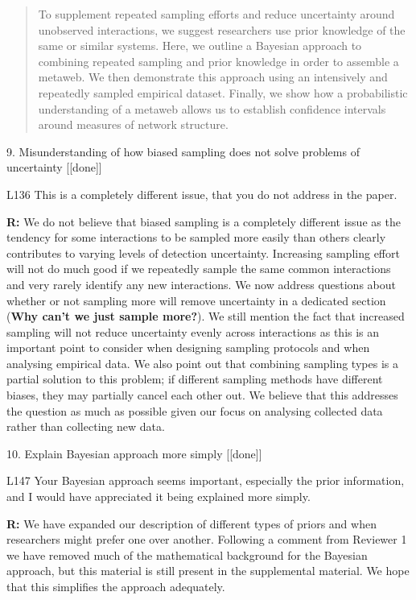 \documentclass[12pt]{letter}
\newenvironment{refquote}{\bigskip \begin{it}}{\end{it}\smallskip}
\begin{document}
		\begin{quotation}
			To supplement repeated sampling efforts and reduce uncertainty around unobserved interactions, we suggest researchers use prior knowledge of the same or similar systems. Here, we outline a Bayesian approach to combining repeated sampling and prior knowledge in order to assemble a metaweb. We then demonstrate this approach using an intensively and repeatedly sampled empirical dataset. Finally, we show how a probabilistic understanding of a metaweb allows us to establish confidence intervals around measures of network structure.
			\end{quotation}


	9. Misunderstanding of how biased sampling does not solve problems of uncertainty [[done]]

		\begin{refquote}
		L136 This is a completely different issue, that you do not address in the paper.
		\end{refquote}

		\textbf{R:} We do not believe that biased sampling is a completely different issue as the tendency for some interactions to be sampled more easily than others clearly contributes to varying levels of detection uncertainty. Increasing sampling effort will not do much good if we repeatedly sample the same common interactions and very rarely identify any new interactions. We now address questions about whether or not sampling more will remove uncertainty in a dedicated section (\textbf{Why can't we just sample more?}). We still mention the fact that increased sampling will not reduce uncertainty evenly across interactions as this is an important point to consider when designing sampling protocols and when analysing empirical data. We also point out that combining sampling types is a partial solution to this problem; if different sampling methods have different biases, they may partially cancel each other out. We believe that this addresses the question as much as possible given our focus on analysing collected data rather than collecting new data.


	10. Explain Bayesian approach more simply [[done]]

		\begin{refquote}
		L147 Your Bayesian approach seems important, especially the prior information, and I would have appreciated it being explained more simply.
		\end{refquote}

		\textbf{R:} We have expanded our description of different types of priors and when researchers might prefer one over another. Following a comment from Reviewer 1 we have removed much of the mathematical background for the Bayesian approach, but this material is still present in the supplemental material. We hope that this simplifies the approach adequately.
\end{document}
